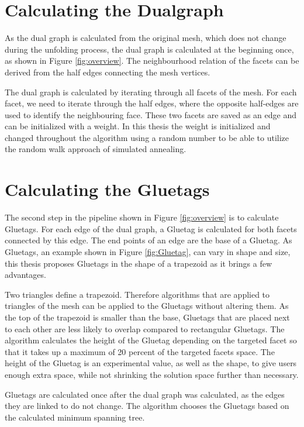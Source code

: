 \documentclass[draft,final]{vutinfth} %
\begin{document}
\section{Calculating the Dualgraph}
\label{sec:calcdual}
As the dual graph is calculated from the original mesh, which does not change during the unfolding process, the dual graph is calculated at the beginning once, as shown in Figure \ref{fig:overview}. The neighbourhood relation of the facets can be derived from the half edges connecting the mesh vertices. 

The dual graph is calculated by iterating through all facets of the mesh. For each facet, we need to iterate through the half edges, where the opposite half-edges are used to identify the neighbouring face. These two facets are saved as an edge and can be initialized with a weight. In this thesis the weight is initialized and changed throughout the algorithm using a random number to be able to utilize the random walk approach of simulated annealing.

\section{Calculating the Gluetags}
\label{sec:calcgluetag}
The second step in the pipeline shown in Figure \ref{fig:overview} is to calculate Gluetags. For each edge of the dual graph, a Gluetag is calculated for both facets connected by this edge. The end points of an edge are the base of a Gluetag. As Gluetags, an example shown in Figure \ref{fig:Gluetag}, can vary in shape and size, this thesis proposes Gluetags in the shape of a trapezoid as it brings a few advantages. 

Two triangles define a trapezoid. Therefore algorithms that are applied to triangles of the mesh can be applied to the Gluetags without altering them. As the top of the trapezoid is smaller than the base, Gluetags that are placed next to each other are less likely to overlap compared to rectangular Gluetags. The algorithm calculates the height of the Gluetag depending on the targeted facet so that it takes up a maximum of 20 percent of the targeted facets space. The height of the Gluetag is an experimental value, as well as the shape, to give users enough extra space, while not shrinking the solution space further than necessary.

Gluetags are calculated once after the dual graph was calculated, as the edges they are linked to do not change. The algorithm chooses the Gluetags based on the calculated minimum spanning tree.
\end{document}

